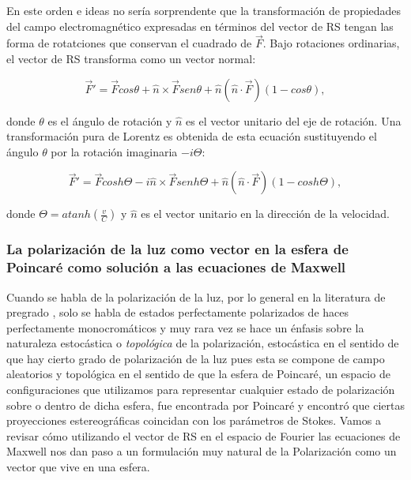             En este orden e ideas no sería sorprendente que la transformación de propiedades del campo electromagnético expresadas en términos del vector de RS tengan las forma de rotatciones que conservan el cuadrado de $\Vec{F}$. Bajo rotaciones ordinarias, el vector de RS transforma como un vector normal:

            \begin{equation}
                \Vec{F}' = \Vec{F}cos\theta + \hat{n}\times \Vec{F}sen\theta + \hat{n}(\hat{n}\cdot\Vec{F})(1-cos\theta),
            \end{equation}

            donde $\theta$ es el ángulo de rotación y $\hat{n}$ es el vector unitario del eje de rotación. Una transformación pura de Lorentz es obtenida de esta ecuación sustituyendo el ángulo $\theta$ por la rotación imaginaria $-i\Theta$:

            \begin{equation}\label{eq:transformRS}
                \Vec{F}' = \Vec{F}cosh\Theta - i\hat{n}\times\Vec{F}senh\Theta + \hat{n}(\hat{n}\cdot\Vec{F})(1-cosh\Theta),
            \end{equation}

            donde $\Theta = atanh\left(\frac{v}{C}\right)$ y $\hat{n}$ es el vector unitario en la dirección de la velocidad.


            
        \subsubsection{La polarización de la luz como vector en la esfera de Poincaré como solución a las ecuaciones de Maxwell}

            Cuando se habla de la polarización de la luz, por lo general en la literatura de pregrado , solo se habla de estados perfectamente polarizados de haces perfectamente monocromáticos y muy rara vez se hace un énfasis sobre la naturaleza estocástica o \textit{topológica} de la polarización, estocástica en el sentido de que hay cierto grado de polarización de la luz pues esta se compone de campo aleatorios y topológica en el sentido de que la esfera de Poincaré, un espacio de configuraciones que utilizamos para representar cualquier estado de polarización sobre o dentro de dicha esfera, fue encontrada por Poincaré  y encontró que ciertas proyecciones estereográficas  coincidan con los parámetros de Stokes. Vamos a revisar cómo utilizando el vector de RS en el espacio de Fourier las ecuaciones de Maxwell nos dan paso a un formulación muy natural de la Polarización como un vector que vive en una esfera.\\


